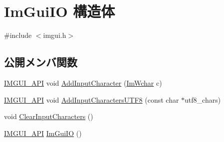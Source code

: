 \hypertarget{struct_im_gui_i_o}{}\section{Im\+Gui\+IO 構造体}
\label{struct_im_gui_i_o}


{\ttfamily \#include $<$imgui.\+h$>$}

\subsection*{公開メンバ関数}
\begin{DoxyCompactItemize}
\item 
\mbox{\hyperlink{imgui_8h_a43829975e84e45d1149597467a14bbf5}{I\+M\+G\+U\+I\+\_\+\+A\+PI}} void \mbox{\hyperlink{struct_im_gui_i_o_a52b6bdef9278de5ae2031311a269cf14}{Add\+Input\+Character}} (\mbox{\hyperlink{imgui_8h_af2c7badaf05a0008e15ef76d40875e97}{Im\+Wchar}} c)
\item 
\mbox{\hyperlink{imgui_8h_a43829975e84e45d1149597467a14bbf5}{I\+M\+G\+U\+I\+\_\+\+A\+PI}} void \mbox{\hyperlink{struct_im_gui_i_o_adaf150a1908c02c3cae15a35915bbb26}{Add\+Input\+Characters\+U\+T\+F8}} (const char $\ast$utf8\+\_\+chars)
\item 
void \mbox{\hyperlink{struct_im_gui_i_o_a82d8794e14e628efbb026af4202c70ca}{Clear\+Input\+Characters}} ()
\item 
\mbox{\hyperlink{imgui_8h_a43829975e84e45d1149597467a14bbf5}{I\+M\+G\+U\+I\+\_\+\+A\+PI}} \mbox{\hyperlink{struct_im_gui_i_o_a0ad8d993e50108b81b0d279d2d43f69d}{Im\+Gui\+IO}} ()
\end{DoxyCompactItemize}
